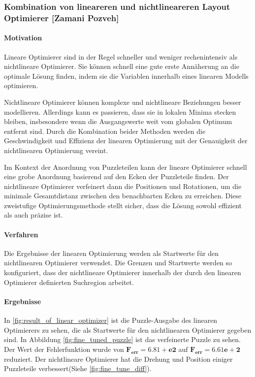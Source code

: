 \subsubsection{Kombination von lineareren und nichtlineareren Layout Optimierer [Zamani Pozveh]}
\label{sec_combination_linear_non_linear}
\paragraph{Motivation} Lineare Optimierer sind in der Regel schneller und weniger rechenintensiv als nichtlineare Optimierer. Sie können schnell eine gute erste Annäherung an die optimale Lösung finden, indem sie die Variablen innerhalb eines linearen Modells optimieren. 

Nichtlineare Optimierer können komplexe und nichtlineare Beziehungen besser modellieren. Allerdings kann es passieren, dass sie in lokalen Minima stecken bleiben, insbesondere wenn die Ausgangswerte weit vom globalen Optimum entfernt sind. Durch die Kombination beider Methoden werden die Geschwindigkeit und Effizienz der linearen Optimierung mit der Genauigkeit der nichtlinearen Optimierung vereint.

Im Kontext der Anordnung von Puzzleteilen kann der lineare Optimierer schnell eine grobe Anordnung basierend auf den Ecken der Puzzleteile finden. Der nichtlineare Optimierer verfeinert dann die Positionen und Rotationen, um die minimale Gesamtdistanz zwischen den benachbarten Ecken zu erreichen. Diese zweistufige Optimierungsmethode stellt sicher, dass die Lösung sowohl effizient als auch präzise ist.

\paragraph{Verfahren} Die Ergebnisse der linearen Optimierung werden als Startwerte für den nichtlinearen Optimierer verwendet. Die Grenzen und Startwerte werden so konfiguriert, dass der nichtlineare Optimierer innerhalb der durch den linearen Optimierer definierten Suchregion arbeitet. 

\paragraph{Ergebnisse}
In \autoref{fig:result_of_linear_optimizer} ist die Puzzle-Ausgabe des linearen Optimierers zu sehen, die als Startwerte für den nichtlinearen Optimierer gegeben sind. In Abbildung \autoref{fig:fine_tuned_puzzle} ist das verfeinerte Puzzle zu sehen. Der Wert der Fehlerfunktion wurde von $\mathbf{F_{\text{err}} = 6.81+e2}$ auf $\mathbf{F_{\text{err}} = 6.61e+2}$ reduziert. Der nichtlineare Optimierer hat die Drehung und Position einiger Puzzleteile verbessert(Siehe \autoref{fig:fine_tune_diff}).


